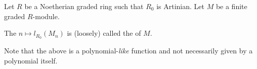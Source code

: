 \documentclass[12pt]{article}	%
\begin{document}
\begin{defn}%
	Let $R$ be a Noetherian graded ring such that $R_0$ is Artinian. Let $M$ be a finite graded $R$-module.

	The $n \mapsto l_{R_0}(M_n)$ is (loosely) called the  of $M.$
\end{defn}
Note that the above is a polynomial-\emph{like} function and not necessarily given by a polynomial itself.





\end{document}
